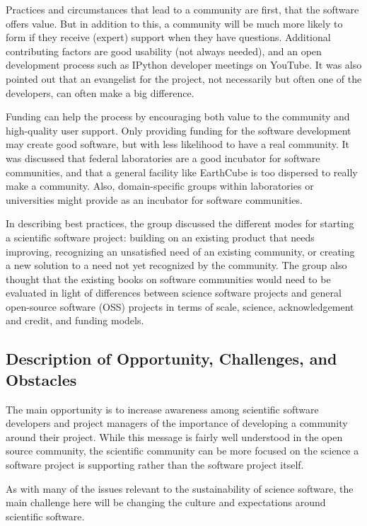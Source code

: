 Practices and circumstances that lead to a community are first, that the
software offers value. But in addition to this, a community will be much more
likely to form if they receive (expert) support when they have questions.
Additional contributing factors are good usability (not always needed), and an
open development process such as IPython developer meetings on YouTube. It was
also pointed out that an evangelist for the project, not necessarily but often
one of the developers, can often make a big difference.

Funding can help the process by encouraging both value to the community and
high-quality user support. Only providing funding for the software development
may create good software, but with less likelihood to have a real community. It
was discussed that federal laboratories are a good incubator for software
communities, and that a general facility like EarthCube is too dispersed to
really make a community. Also, domain-specific groups within laboratories or
universities might provide as an incubator for software communities.

In describing best practices, the group discussed the different modes for
starting a scientific software project: building on an existing product that
needs improving, recognizing an unsatisfied need of an existing community, or
creating a new solution to a need not yet recognized by the community. The group
also thought that the existing books on software communities would need to be
evaluated in light of differences between science software projects and general
open-source software (OSS) projects in terms of scale, science, acknowledgement and credit, and funding
models.


\subsection{Description of Opportunity, Challenges, and Obstacles}

The main opportunity is to increase awareness among scientific
software developers and project managers of the importance of
developing a community around their project.
While this message is fairly well understood in the open source
community, the scientific community can be more focused on the
science a software project is supporting rather than the software
project itself.

As with many of the issues relevant to the sustainability of science
software, the main challenge here will be changing the culture and
expectations around scientific software.

